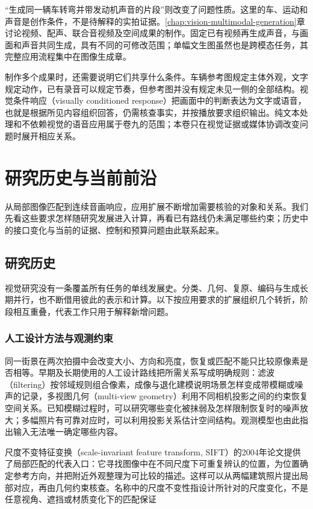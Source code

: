 “生成同一辆车转弯并带发动机声音的片段”则改变了问题性质。这里的车、运动和声音是创作条件，不是待解释的实拍证据。\ref{chap:vision-multimodal-generation}章讨论视频、配声、联合音视频及空间成果的制作。固定已有视频再生成声音，与画面和声音共同生成，具有不同的可修改范围；单幅文生图虽然也是跨模态任务，其完整应用流程集中在图像生成章。

制作多个成果时，还需要说明它们共享什么条件。车辆参考图规定主体外观，文字规定动作，已有录音可以规定节奏，但参考图并没有规定未见一侧的全部结构。视觉条件响应（visually conditioned response）把画面中的判断表达为文字或语音，也就是根据所见内容组织回答，仍需核查事实，并按播放要求组织输出。纯文本处理和不依赖视觉的语音应用属于卷九的范围；本卷只在视觉证据或媒体协调改变问题时展开相应关系。

\section{研究历史与当前前沿}
\label{sec:vision-overview-history-and-frontiers}

从局部图像匹配到连续音画响应，应用扩展不断增加需要核验的对象和关系。我们先看这些要求怎样随研究发展进入计算，再看已有路线仍未满足哪些约束；历史中的接口变化与当前的证据、控制和预算问题由此联系起来。

\subsection{研究历史}
\label{sec:vision-overview-history}

视觉研究没有一条覆盖所有任务的单线发展史。分类、几何、复原、编码与生成长期并行，也不断借用彼此的表示和计算。以下按应用要求的扩展组织几个转折，阶段相互重叠，代表工作只用于解释新增问题。

\subsubsection{人工设计方法与观测约束}
\label{sec:vision-overview-classical-history}

同一街景在两次拍摄中会改变大小、方向和亮度，恢复或匹配不能只比较原像素是否相等。早期及长期使用的人工设计路线把所需关系写成明确规则：滤波（filtering）按邻域规则组合像素，成像与退化建模说明场景怎样变成带模糊或噪声的记录，多视图几何（multi-view geometry）利用不同相机投影之间的约束恢复空间关系。已知模糊过程时，可以研究哪些变化被抹弱及怎样限制恢复时的噪声放大；多幅照片有可靠对应时，可以利用投影关系估计空间结构。观测模型也由此指出输入无法唯一确定哪些内容。

尺度不变特征变换（scale-invariant feature transform, SIFT）的2004年论文提供了局部匹配的代表入口：它寻找图像中在不同尺度下可重复辨认的位置，为位置确定参考方向，并把附近外观整理为可比较的描述。这样可以从两幅建筑照片提出局部对应，再由几何约束核查。名称中的尺度不变性指设计所针对的尺度变化，不是任意视角、遮挡或材质变化下的匹配保证

